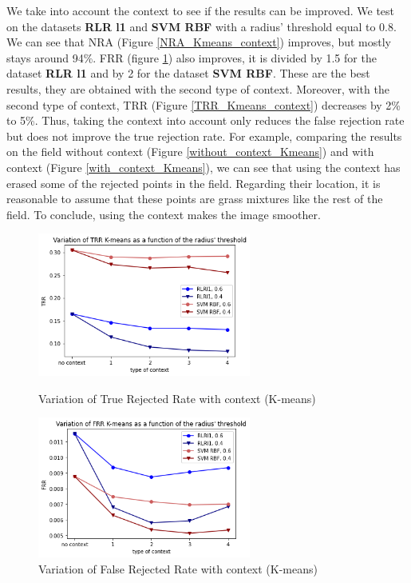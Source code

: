 \documentclass{siamart171218}
\begin{document}
 We take into account the context to see if the results can be improved. We test on the datasets \textbf{RLR l1} and \textbf{SVM RBF} with a radius' threshold equal to 0.8. We can see that NRA (Figure \ref{NRA_Kmeans_context}) improves, but mostly stays around 94\%. FRR (figure \ref{FRR_Kmeans_context}) also improves, it is divided by 1.5 for the dataset \textbf{RLR l1} and by 2 for the dataset \textbf{SVM RBF}. These are the best results, they are obtained with the second type of context. Moreover, with the second type of context, TRR (Figure \ref{TRR_Kmeans_context}) decreases by 2\% to 5\%. Thus, taking the context into account only reduces the false rejection rate but does not improve the true rejection rate. For example, comparing the results on the field without context (Figure \ref{without_context_Kmeans}) and with context (Figure \ref{with_context_Kmeans}), we can see that using the context has erased some of the rejected points in the field. Regarding their location, it is reasonable to assume that these points are grass mixtures like the rest of the field. To conclude, using the context makes the image smoother.

\begin{figure}[h]
    \begin{minipage}[c]{.46\linewidth}
        \centering
        \includegraphics[width=7cm]{images/TRR_Kmeans_context.png}
        \caption{Variation of True Rejected Rate with context (K-means)}
        \label{TRR_Kmeans_context}
    \end{minipage}
    \hfill
    \begin{minipage}[c]{.46\linewidth}
        \centering
        \includegraphics[width=7cm]{images/FRR_Kmeans_context.png}
        \caption{Variation of False Rejected Rate with context (K-means)}
        \label{FRR_Kmeans_context}
    \end{minipage}
    \hfill
\end{figure}
\end{document}
